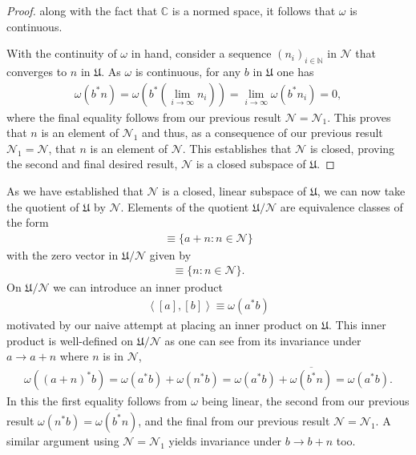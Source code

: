\begin{proof}
\noindent along with the fact that $\mathbb{C}$ is a normed space, it follows that $\omega$ is continuous.

With the continuity of $\omega$ in hand, consider a sequence $(n_i)_{i \in \mathbb{N}}$ in $\mathcal{N}$ that converges to $n$ in $\mathfrak{U}$. As $\omega$ is continuous, for any $b$ in $\mathfrak{U}$ one has
\begin{align}
    \omega\left(b^*n\right) = \omega\left(b^*(\lim\limits_{i \rightarrow \infty} n_i)\right) = \lim\limits_{i \rightarrow \infty} \omega(b^*n_i) = 0,
\end{align}
where the final equality follows from our previous result $\mathcal{N} = \mathcal{N}_1$. This proves that $n$ is an element of $\mathcal{N}_1$ and thus, as a consequence of our previous result $\mathcal{N}_1 = \mathcal{N}$, that $n$ is an element of $\mathcal{N}$. This establishes that $\mathcal{N}$ is closed, proving the second and final desired result, $\mathcal{N}$ is a closed subspace of $\mathfrak{U}$.
\end{proof}

As we have established that $\mathcal{N}$ is a closed, linear subspace of $\mathfrak{U}$, we can now take the quotient of $\mathfrak{U}$ by $\mathcal{N}$. Elements of the quotient $\mathfrak{U} / \mathcal{N}$ are equivalence classes of the form
\begin{align}
    [a] \equiv \{ a + n : n \in \mathcal{N} \}
\end{align}
with the zero vector in $\mathfrak{U} / \mathcal{N}$ given by
\begin{align}
    [0] \equiv \{ n : n \in \mathcal{N} \}.
\end{align}
On $\mathfrak{U} / \mathcal{N}$ we can introduce an inner product
\begin{align}
    \left<[a], [b]\right> \equiv \omega(a^*b)
\end{align}
motivated by our naive attempt at placing an inner product on $\mathfrak{U}$. This inner product is well-defined on $\mathfrak{U} / \mathcal{N}$ as one can see from its invariance under $a \rightarrow a + n$ where $n$ is in $\mathcal{N}$,
\begin{align}
    \omega((a + n)^*b) = \omega(a^*b) + \omega(n^*b) = \omega(a^*b) + \overline{\omega(b^*n)} = \omega(a^*b).
\end{align}
In this the first equality follows from $\omega$ being linear, the second from our previous result $\omega(n^*b) = \overline{\omega(b^*n)}$, and the final from our previous result $\mathcal{N} = \mathcal{N}_1$. A similar argument using $\mathcal{N} = \mathcal{N}_1$ yields invariance under $b \rightarrow b + n$ too.

